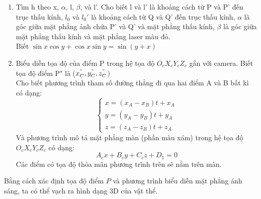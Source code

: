 \begin{enumerate}[label=(\alph*)]
\addtocounter{enumi}{2}
\item Tìm h theo x, $\alpha$, l, $\beta$, và l’. Cho biết l và l' là khoảng cách từ P và P' đến trục thấu kính, $l_0$ và $l_0'$ là khoảng cách từ Q và Q' đến trục thấu kính, $\alpha$ là góc giữa mặt phẳng ảnh chứa P' và Q' và mặt phẳng thấu kính, $\beta$ là góc giữa mặt phẳng thấu kính và mặt phẳng laser màu đỏ. \\
Biết $\sin x \cos y+\cos x \sin y=\sin{(y+x)}$
\item Biểu diễn tọa độ của điểm P trong hệ tọa độ $O_cX_cY_cZ_c$ gắn với camera. Biết tọa độ điểm P" là ($x^"_C, y^"_C, z^"_C$)\\ 
Cho biết phương trình tham số đường thẳng đi qua hai điểm A và B bất kì có dạng: 
\setcounter{equation}{0}
\begin{equation}
    \begin{cases}
    x = (x_A - x_B)t + x_A \\
    y = (y_A - y_B)t + y_A \\
    z = (z_A - z_B)t + z_A
\end{cases}
\end{equation}
Và phương trình mô tả mặt phẳng màn (phần màu xám) trong hệ tọa độ $O_cX_cY_cZ_c$ có dạng: 
\begin{equation}
    A_cx+B_cy+C_cz+D_1=0
\end{equation}
Các điểm có tọa độ thỏa mãn phương trình trên sẽ nằm trên màn.
\end{enumerate}
Bằng cách xác định tọa độ điểm $P$ và phương trình biểu diễn mặt phẳng ánh sáng, ta có thể vạch ra hình dạng 3D của vật thể.
